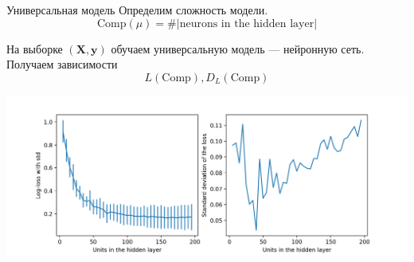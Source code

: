 \documentclass{beamer}
\newcommand{\by}{\mathbf{y}}
\newcommand{\bX}{\mathbf{X}}
\begin{document}

\begin{frame}{Универсальная модель}
    Определим сложность модели.
    $$
        \mathrm{Comp}(\mu) = \#|\text{neurons in the hidden layer}|
    $$

    На выборке $(\bX, \by)$ обучаем универсальную модель — нейронную сеть.
    Получаем зависимости
    $$
        L(\mathrm{Comp}), D_L(\mathrm{Comp})
    $$
    \begin{center}
        \includegraphics[width=\textwidth]{../pics/loss_and_std_of_n_units_reg.png}
    \end{center}
\end{frame}

\end{document}
